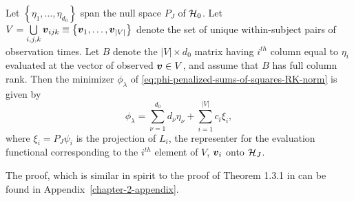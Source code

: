  \begin{theorem} \label{theorem:finite-dimensional-minimizer}
 Let $\left\{\eta_1,\dots, \eta_{d_0}\right\}$ span the null space $P_J$ of $\mathcal{H}_0$. Let  $V = \bigcup\limits_{i,j,k} \mbox{\boldmath $v$}_{ijk} \equiv \left\{ \mbox{\boldmath $v$}_1,\dots,\mbox{\boldmath $v$}_{\vert V \vert} \right\}$ denote the set of unique within-subject pairs of observation times. Let $B$ denote the $\vert V \vert \times d_0$ matrix having $i^{th}$ column equal to $\eta_i$ evaluated at the vector of observed $\mbox{\boldmath $v$} \in V$, and assume that $B$ has full column rank. Then the minimizer $\phi_\lambda$ of \ref{eq:phi-penalized-sums-of-squares-RK-norm} is given by
 \begin{equation} \label{eq:form-of-the-minimizer-phi}
\phi_\lambda = \sum_{\nu = 1}^{d_0} d_\nu \eta_{\nu} + \sum_{i = 1}^{\vert V \vert} c_i \xi_i,
\end{equation}
\noindent
where $\xi_i = P_J \psi_i$ is the projection of $L_i$, the representer for the evaluation functional corresponding to the $i^{th}$ element of $V$,  ${\mbox{\boldmath $v$}_i}$ onto $\mathcal{H}_J$.
\end{theorem}
\vspace{0.5cm}
\noindent
The proof, which is similar in spirit to the proof of Theorem 1.3.1 in \cite{wahba1990spline} can be found in Appendix~\ref{chapter-2-appendix}.

\bigskip

%

